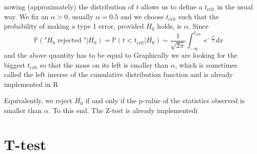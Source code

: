 nowing (approximately) the distribution of $t$ allows us to define a $t_{\text{crit}}$ in the usual way. We fix an $\alpha  >0$, usually $\alpha = 0.5$ and we choose $t_{\text{crit}}$ such that the probability of making a type 1 error, provided $H_0$ holds, is $\alpha$. Since 
      \begin{equation}
      	\label{e:t_crit}
      		\mathbb P(\text{"$H_0$ rejected "}|H_0) = \mathbb P( t < t_{\text{crit}}| H_0 ) \sim \frac{1}{\sqrt{2\pi}}\int_{-\infty }^{t_{\text{crit}}} e^{-\frac{x^2}{2}}dx
      \end{equation}
      and the above quantity has to be equal to 
      Graphically we are looking for the biggest $t_{\text{crit}}$ so that the mass on its left is smaller than $\alpha$, which is sometimes called the left inverse of the cumulative distribution function and is already implemented in R 

      Equivalently, we reject $H_0$ if and only if the p-value of the statistics observed is smaller than $\alpha$. To this end. 
      The Z-test is already implementedi 
      	
      \section{T-test}

